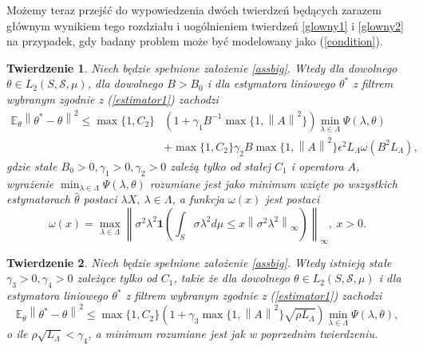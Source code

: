 \documentclass[man,mfiu]{mgrwms}
\newcommand{\norm}[1]{\left\lVert#1\right\rVert}
\newtheorem{tw}{Twierdzenie}[chapter]
\begin{document}
Możemy teraz przejść do wypowiedzenia dwóch twierdzeń będących zarazem głównym wynikiem tego rozdziału i uogólnieniem twierdzeń \ref{glowny1} i \ref{glowny2} na przypadek, gdy badany problem może być modelowany jako (\ref{condition}). 


\begin{tw}\label{glowny3}
Niech będzie spełnione założenie \ref{assbig}. Wtedy dla dowolnego $\theta\in L_2(S,\mathcal{S},\mu)$, dla dowolnego $B>B_0$ i dla estymatora liniowego $\theta^*$ z filtrem wybranym zgodnie z (\ref{estimator1}) zachodzi
\begin{displaymath}
\begin{split}
\mathbb{E}_{\theta}\norm{\theta^*-\theta}^2 \leq \max \{1,C_2\}&(1+\gamma_1B^{-1}\max\{1,\norm{A}^2\})\min_{\lambda\in \Lambda}\Psi(\lambda,\theta)\\
 & + \max \{1,C_2\}\gamma_2B\max\{1,\norm{A}^2\}\epsilon^2L_{\Lambda}\omega(B^2L_{\Lambda}),
\end{split}
\end{displaymath}
gdzie stałe $B_0>0,\gamma_1>0,\gamma_2>0$ zależą tylko od stałej $C_1$ i operatora $A$, wyrażenie $\min_{\lambda\in \Lambda}\Psi(\lambda,\theta)$ rozumiane jest jako minimum wzięte po wszystkich estymatorach $\hat{\theta}$ postaci $\lambda X,\ \lambda\in \Lambda$, a funkcja $\omega(x)$ jest postaci
\begin{displaymath}
\omega(x)=\max_{\lambda\in \Lambda}\norm{\sigma^2\lambda^2\pmb{1}\left(\int_S\sigma\lambda^2d\mu\leq x \norm{\sigma^2\lambda^2}_{\infty}\right)}_{\infty},\ x>0.
\end{displaymath}
\end{tw}
\begin{tw}\label{glowny4}
Niech będzie spełnione założenie \ref{assbig}. Wtedy istnieją stałe $\gamma_3>0,\gamma_4>0$ zależące tylko od $C_1$, takie że dla dowolnego $\theta\in L_2(S,\mathcal{S},\mu)$ i dla estymatora liniowego $\theta^*$ z filtrem wybranym zgodnie z (\ref{estimator1}) zachodzi
\begin{displaymath}
\mathbb{E}_{\theta}\norm{\theta^*-\theta}^2\leq \max \{1,C_2\}(1+\gamma_3\max\{1,\norm{A}^2\}\sqrt{ \rho L_{\Lambda}})\min_{\lambda\in \Lambda}\Psi(\lambda,\theta),
\end{displaymath}
o ile $\rho\sqrt{L_{\Lambda}}<\gamma_4$, a minimum rozumiane jest jak w poprzednim twierdzeniu.
\end{tw}
\end{document}
